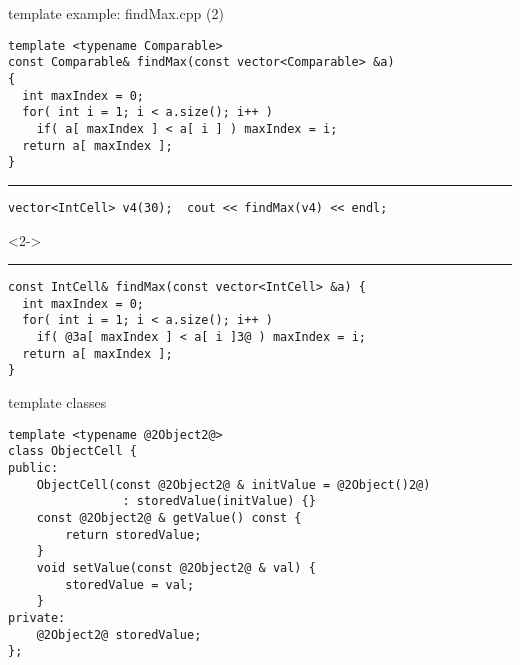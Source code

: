 \begin{frame}[fragile,label=findMax2]{template example: findMax.cpp (2)}
\begin{lstlisting}
template <typename Comparable>
const Comparable& findMax(const vector<Comparable> &a)
{
  int maxIndex = 0; 
  for( int i = 1; i < a.size(); i++ ) 
    if( a[ maxIndex ] < a[ i ] ) maxIndex = i; 
  return a[ maxIndex ]; 
}
\end{lstlisting}
\hrule
\begin{lstlisting}
vector<IntCell> v4(30);  cout << findMax(v4) << endl;
\end{lstlisting}
\begin{visibleenv}<2->
\hrule
\begin{lstlisting}
const IntCell& findMax(const vector<IntCell> &a) {
  int maxIndex = 0; 
  for( int i = 1; i < a.size(); i++ ) 
    if( @3a[ maxIndex ] < a[ i ]3@ ) maxIndex = i; 
  return a[ maxIndex ]; 
}
\end{lstlisting}
\end{visibleenv}
\end{frame}


\begin{frame}[fragile,label=tempClass]{template classes}
\begin{lstlisting}
template <typename @2Object2@>
class ObjectCell {
public:
    ObjectCell(const @2Object2@ & initValue = @2Object()2@) 
                : storedValue(initValue) {}
    const @2Object2@ & getValue() const {
        return storedValue;
    }
    void setValue(const @2Object2@ & val) {
        storedValue = val;
    }
private:
    @2Object2@ storedValue;
};
\end{lstlisting}
\end{frame}

